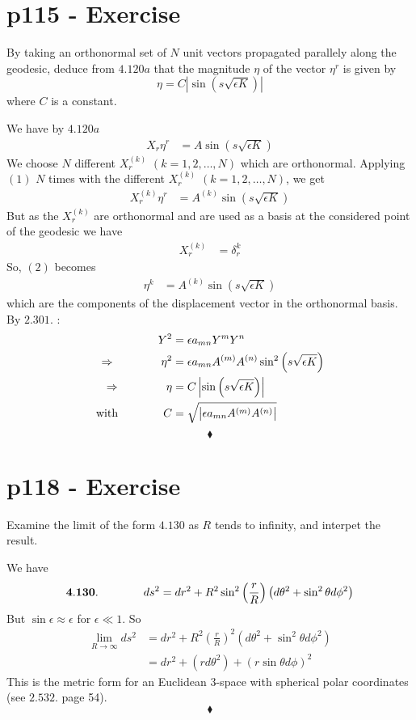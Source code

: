 \section{p115 - Exercise}
\begin{tcolorbox}
By taking an orthonormal set of $N$ unit vectors propagated parallely along the geodesic, deduce from $4.120a$ that the magnitude $\eta$ of the vector $\eta^r$ is given by $$ \eta = C\left|\sin \left(s\sqrt{\epsilon K}\right)\right|$$ where $C$ is a constant.
\end{tcolorbox}
We have by $4.120a$
\begin{align}
X_r \eta^r &= A\sin \left(s\sqrt{\epsilon K}\right)
\end{align}
We choose $N$ different $X^{(k)}_r$ $(k= 1,2,\dots, N)$ which are orthonormal.
Applying $(1)$ $N$ times with the different $X^{(k)}_r$ $(k= 1,2,\dots, N)$, we get
\begin{align}
X^{(k)}_r \eta^r &= A^{(k)}\sin \left(s\sqrt{\epsilon K}\right)
\end{align}
But as the $X^{(k)}_r$ are orthonormal and are used as a basis at the considered point of the geodesic we have 
\begin{align}
X^{(k)}_r &= \delta^k_r
\end{align}
So, $(2)$ becomes
\begin{align}
\eta^k &= A^{(k)}\sin \left(s\sqrt{\epsilon K}\right)
\end{align}
which are the components of the displacement vector in the orthonormal basis. By $\mathbf{2.301.}$ :
\begin{align}
Y^2 &= \epsilon a_{mn} Y^m Y^n\\
\Rightarrow \quad\quad\quad\quad \eta^2 &= \epsilon a_{mn} A^{(m)} A^{(n)}\sin^2 \left(s\sqrt{\epsilon K}\right)\\
\Rightarrow \quad\quad\quad\quad \eta &= C\left|\sin \left(s\sqrt{\epsilon K}\right)\right|\\
\text{with}\quad\quad\quad\quad C&= \sqrt{\left|\epsilon a_{mn} A^{(m)} A^{(n)}\right|}
\end{align}
$$\blacklozenge$$
\newpage

\section{p118 - Exercise}
\begin{tcolorbox}
Examine the limit of the form $\mathbf{4.130}$ as $R$ tends to infinity, and interpet the result.
\end{tcolorbox}
We have $$\mathbf{4.130.}\quad\quad\quad\quad ds^2 = dr^2+R^2\sin^2\left(\frac{r}{R}\right)\left(d\theta^2 + \sin^2\theta d\phi^2\right)$$
But $\sin \epsilon \approx \epsilon$ for $\epsilon  \ll 1$. So
\begin{align}
 \lim_{R\rightarrow \infty} ds^2 &= dr^2+R^2\left(\frac{r}{R}\right)^2\left(d\theta^2 + \sin^2\theta d\phi^2\right)\\
 &= dr^2+\left(r d\theta^2 \right) + \left(r\sin\theta d\phi\right)^2
 \end{align}
 This is the metric form for an Euclidean 3-space with spherical polar coordinates (see $\mathbf{2.532.}$ page 54).
$$\blacklozenge$$
\newpage

